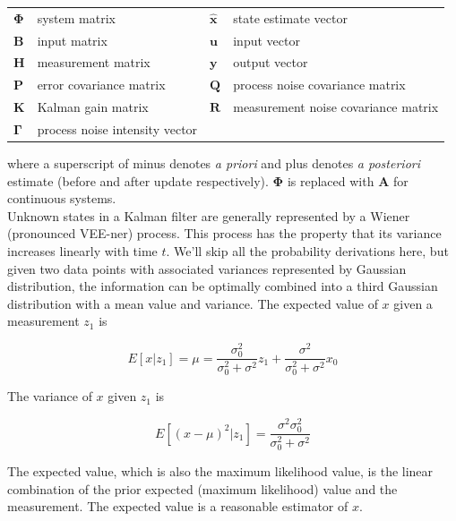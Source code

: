 \documentclass[10pt,conference,compsoc]{IEEEtran}
\newcommand{\mtx}[1] {\bm #1}
\begin{document}
\begin{table}[ht]
  \renewcommand{\arraystretch}{1.3}
  \centering
  \begin{tabulary}{\linewidth}{LLLL}
    $\mtx{\Phi}$ & system matrix &
      $\hat{\mtx{x}}$ & state estimate vector \\
    $\mtx{B}$ & input matrix            & $\mtx{u}$ & input vector \\
    $\mtx{H}$ & measurement matrix      & $\mtx{y}$ & output vector \\
    $\mtx{P}$ & error covariance matrix &
      $\mtx{Q}$ & process noise covariance matrix \\
    $\mtx{K}$ & Kalman gain matrix &
      $\mtx{R}$ & measurement noise covariance matrix \\
    $\mtx{\Gamma}$ & process noise intensity vector &
  \end{tabulary}
  \label{tab:kalman_def}
\end{table}

where a superscript of minus denotes \textit{a priori} and plus denotes
\textit{a posteriori} estimate (before and after update respectively).
$\mtx{\Phi}$ is replaced with $\mtx{A}$ for continuous systems. \\

Unknown states in a Kalman filter are generally represented by a Wiener
(pronounced VEE-ner) process. This process has the property that its variance
increases linearly with time $t$. We'll skip all the probability derivations
here, but given two data points with associated variances represented by
Gaussian distribution, the information can be optimally combined into a third
Gaussian distribution with a mean value and variance. The expected value of $x$
given a measurement $z_1$ is

\begin{equation}
  E[x|z_1] = \mu = \frac{\sigma_0^2}{\sigma_0^2 + \sigma^2}z_1 +
    \frac{\sigma^2}{\sigma_0^2 + \sigma^2}x_0
\end{equation}

The variance of $x$ given $z_1$ is

\begin{equation}
  E[(x - \mu)^2|z_1] = \frac{\sigma^2 \sigma_0^2}{\sigma_0^2 + \sigma^2}
\end{equation}

The expected value, which is also the maximum likelihood value, is the linear
combination of the prior expected (maximum likelihood) value and the
measurement. The expected value is a reasonable estimator of $x$.
\end{document}

